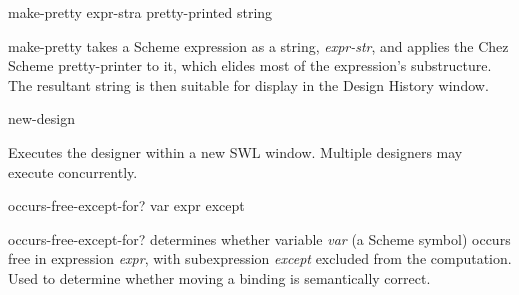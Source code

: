 \documentclass{article}
\begin{document}
\begin{proc}{make-pretty}{ expr-str}{a pretty-printed string}

{\sf make-pretty} takes a Scheme expression as a string, {\sl
expr-str}, and applies the Chez Scheme pretty-printer to it, which
elides most of the expression's substructure.  The resultant string is
then suitable for display in the Design History window.

\end{proc}



\begin{proc}{new-design}{}{}

Executes the designer within a new {\sc SWL} window.  Multiple designers
may execute concurrently.

\end{proc}



\begin{proc}{occurs-free-except-for?}{ var expr except}{}

{\sf occurs-free-except-for?} determines whether variable {\sl var} (a
Scheme symbol) occurs free in expression {\sl expr}, with
subexpression {\sl except} excluded from the computation.  Used to
determine whether moving a binding is semantically correct.

\end{proc}
\end{document}
